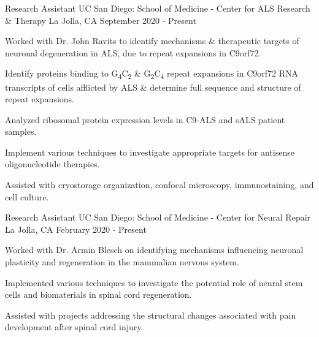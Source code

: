 \begin{cventries}
\cventry
{Research Assistant} %
{UC San Diego: School of Medicine - Center for ALS Research \& Therapy} %
{La Jolla, CA} %
{September 2020 - Present} %
{
  \begin{cvitems} %
    \item {Worked with Dr. John Ravits to identify mechanisms \& therapeutic targets of neuronal degeneration in ALS, due to repeat expansions in C9orf72.}
    \item {Identify proteins binding to G\textsubscript{4}C\textsubscript{2} \& G\textsubscript{2}C\textsubscript{4} repeat expansions in C9orf72 RNA transcripts of cells afflicted by ALS \& determine full sequence and structure of repeat expansions.}
    \item {Analyzed ribosomal protein expression levels in C9-ALS and sALS patient samples.}
    \item {Implement various techniques to investigate appropriate targets for antisense oligonucleotide therapies.}
    \item {Assisted with cryostorage organization, confocal microscopy, immunostaining, and cell culture.}
  \end{cvitems}
}
\cventry
{Research Assistant} %
{UC San Diego: School of Medicine - Center for Neural Repair} %
{La Jolla, CA} %
{February 2020 - Present} %
{
  \begin{cvitems} %
    \item {Worked with Dr. Armin Blesch on identifying mechanisms influencing neuronal plasticity and regeneration in the mammalian nervous system.}
    \item {Implemented various techniques to investigate the potential role of neural stem cells and biomaterials in spinal cord regeneration.}
    \item {Assisted with projects addressing the structural changes associated with pain development after spinal cord injury.}

\end{cvitems}}
\end{cventries}

